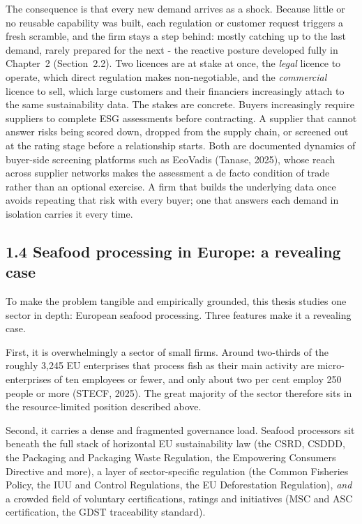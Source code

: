 The consequence is that every new demand arrives as a shock. Because little or no
reusable capability was built, each regulation or customer request triggers a
fresh scramble, and the firm stays a step behind: mostly catching up to the last
demand, rarely prepared for the next - the reactive posture developed fully in
Chapter~2 (Section~2.2). Two licences are at stake at once, the
\emph{legal} licence to operate, which direct regulation makes non-negotiable,
and the \emph{commercial} licence to sell, which large customers and their
financiers increasingly attach to the same sustainability data.
The stakes are concrete. Buyers increasingly require suppliers to complete ESG
assessments before contracting. A supplier that cannot answer risks being scored
down, dropped from the supply chain, or screened out at the rating stage before a
relationship starts. Both are documented dynamics of buyer-side screening
platforms such as EcoVadis (Tanase, 2025), whose reach across supplier networks
makes the assessment a de facto condition of trade rather than an optional
exercise.
A firm that builds the underlying data once avoids repeating that risk with
every buyer; one that answers each demand in isolation carries it every time.

\subsection{1.4 Seafood processing in Europe: a revealing
case}\label{seafood-processing-a-revealing-case}

To make the problem tangible and empirically grounded, this thesis studies one
sector in depth: European seafood processing. Three features make it a revealing
case.

First, it is overwhelmingly a sector of small firms. Around two-thirds of the
roughly 3{,}245 EU enterprises that process fish as their main activity are
micro-enterprises of ten employees or fewer, and only about two per cent employ
250 people or more (STECF, 2025). The great majority of the sector therefore sits
in the resource-limited position described above.

Second, it carries a dense and fragmented governance load. Seafood processors
sit beneath the full stack of horizontal EU sustainability law (the CSRD, CSDDD,
the Packaging and Packaging Waste Regulation, the Empowering Consumers Directive
and more), a layer of sector-specific regulation (the Common Fisheries Policy,
the IUU and Control Regulations, the EU Deforestation Regulation), \emph{and} a
crowded field of voluntary certifications, ratings and initiatives (MSC and ASC
certification, the GDST traceability standard).

